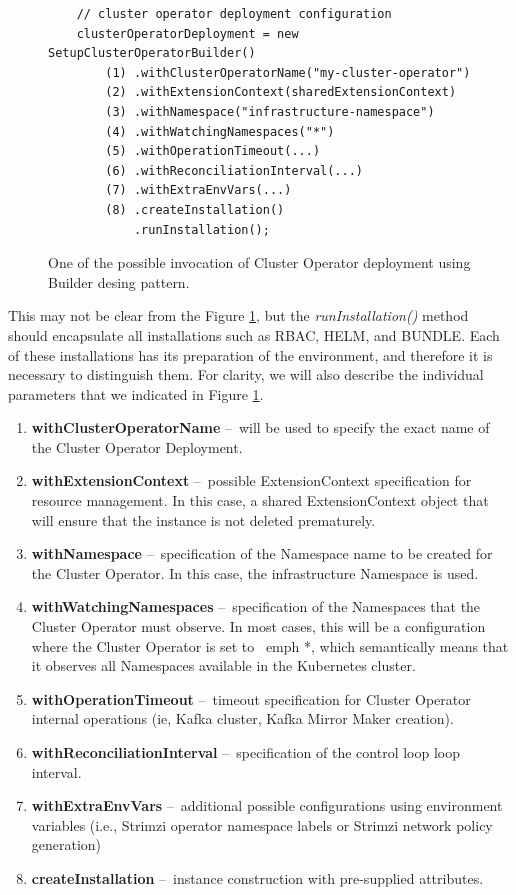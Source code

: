 \begin{figure}[ht!]
    \centering
    \begin{verbatim}
    // cluster operator deployment configuration
    clusterOperatorDeployment = new SetupClusterOperatorBuilder()
        (1) .withClusterOperatorName("my-cluster-operator")
        (2) .withExtensionContext(sharedExtensionContext)
        (3) .withNamespace("infrastructure-namespace")
        (4) .withWatchingNamespaces("*")
        (5) .withOperationTimeout(...)
        (6) .withReconciliationInterval(...)
        (7) .withExtraEnvVars(...)
        (8) .createInstallation()
            .runInstallation();
    \end{verbatim}
    \caption{One of the possible invocation of Cluster Operator deployment using Builder desing pattern.}
    \label{05:fig:clusteroperatorinstallation}
\end{figure}

This may not be clear from the Figure \ref{05:fig:clusteroperatorinstallation}, but the \emph{runInstallation()} method should encapsulate all installations such as RBAC, HELM, and BUNDLE. Each of these installations has its preparation of the environment, and therefore it is necessary to distinguish them. For clarity, we will also describe the individual parameters that we indicated in Figure \ref{05:fig:clusteroperatorinstallation}.

\begin{enumerate}[itemsep = 1mm, parsep = 0pt]
    \item \textbf{withClusterOperatorName} \---\ will be used to specify the exact name of the Cluster Operator Deployment.
    \item \textbf{withExtensionContext} \---\ possible ExtensionContext specification for resource management. In this case, a shared ExtensionContext object that will ensure that the instance is not deleted prematurely.
    \item \textbf{withNamespace} \---\ specification of the Namespace name to be created for the Cluster Operator. In this case, the infrastructure Namespace is used.
    \item \textbf{withWatchingNamespaces} \---\ specification of the Namespaces that the Cluster Operator must observe. In most cases, this will be a configuration where the Cluster Operator is set to \ emph {*}, which semantically means that it observes all Namespaces available in the Kubernetes cluster.
    \item \textbf{withOperationTimeout} \---\ timeout specification for Cluster Operator internal operations (ie, Kafka cluster, Kafka Mirror Maker creation).
    \item \textbf{withReconciliationInterval} \---\ specification of the control loop loop interval.
    \item \textbf{withExtraEnvVars} \---\ additional possible configurations using environment variables (i.e., Strimzi operator namespace labels or Strimzi network policy generation)
    \item \textbf{createInstallation} \---\ instance construction with pre-supplied attributes.
\end{enumerate}

